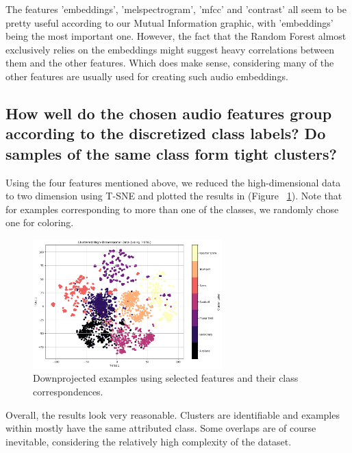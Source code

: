 The features 'embeddings', 'melspectrogram', 'mfcc' and 'contrast' all seem to be pretty useful according to our Mutual Information graphic, with 'embeddings' being the most important one. However, the fact that the Random Forest almost exclusively relies on the embeddings might suggest heavy correlations between them and the other features. Which does make sense, considering many of the other features are usually used for creating such audio embeddings.


\subsection{How well do the chosen audio features group according to the discretized class labels? Do samples of the same class form tight clusters?}
\label{sec:Labeling Function:c}
Using the four features mentioned above, we reduced the high-dimensional data to two dimension using T-SNE and plotted the results in (Figure ~\ref{fig:1_TSNE}). Note that for examples corresponding to more than one of the classes, we randomly chose one for coloring.

\begin{figure}[htbp]
    \centering
    \includegraphics[width=0.5\linewidth, height=5cm]{figs/1_TSNE.png}
    \caption{Downprojected examples using selected features and their class correspondences.}
    \label{fig:1_TSNE}
\end{figure}

Overall, the results look very reasonable. Clusters are identifiable and examples within mostly have the same attributed class. Some overlaps are of course inevitable, considering the relatively high complexity of the dataset. 